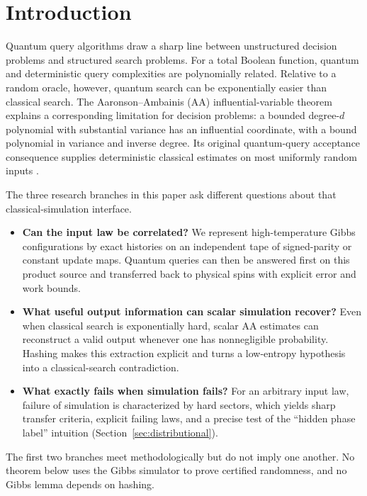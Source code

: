 \documentclass[11pt]{article}
\theoremstyle{definition}\newtheorem{definition}[theorem]{Definition}
\theoremstyle{remark}\newtheorem{remark}[theorem]{Remark}
\begin{document}
\section{Introduction}\label{sec:introduction}
Quantum query algorithms draw a sharp line between unstructured decision problems and structured search problems. For a total Boolean function, quantum and deterministic query complexities are polynomially related. Relative to a random oracle, however, quantum search can be exponentially easier than classical search. The Aaronson--Ambainis (AA) influential-variable theorem explains a corresponding limitation for decision problems: a bounded degree-$d$ polynomial with substantial variance has an influential coordinate, with a bound polynomial in variance and inverse degree. Its original quantum-query acceptance consequence supplies deterministic classical estimates on most uniformly random inputs \cite{AA14,Tur26,BDST26}.

The three research branches in this paper ask different questions about that classical-simulation interface.
\begin{itemize}
\item \textbf{Can the input law be correlated?} We represent high-temperature Gibbs configurations by exact histories on an independent tape of signed-parity or constant update maps. Quantum queries can then be answered first on this product source and transferred back to physical spins with explicit error and work bounds.
\item \textbf{What useful output information can scalar simulation recover?} Even when classical search is exponentially hard, scalar AA estimates can reconstruct a valid output whenever one has nonnegligible probability. Hashing makes this extraction explicit and turns a low-entropy hypothesis into a classical-search contradiction.
\item \textbf{What exactly fails when simulation fails?} For an arbitrary input law, failure of simulation is characterized by hard sectors, which yields sharp transfer criteria, explicit failing laws, and a precise test of the ``hidden phase label'' intuition (Section~\ref{sec:distributional}).
\end{itemize}
The first two branches meet methodologically but do not imply one another. No theorem below uses the Gibbs simulator to prove certified randomness, and no Gibbs lemma depends on hashing.
\end{document}
